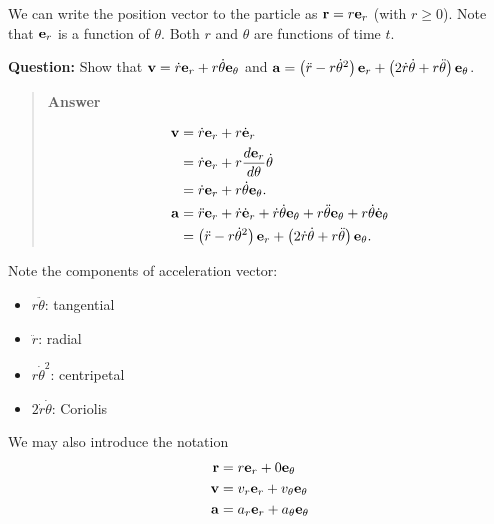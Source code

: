 \documentclass[
  letterpaper,
  DIV=11,
  numbers=noendperiod]{scrreprt}
\providecommand{\tightlist}{%
  \setlength{\itemsep}{0pt}\setlength{\parskip}{0pt}}
\newcommand{\lp}{\left(}
\newcommand{\rp}{\right)}
\begin{document}
We can write the position vector to the particle as
\({\bf r} = r{\bf e}_r\) (with \(r\geq 0\)). Note that \({\bf e}_r\) is
a function of \(\theta\). Both \(r\) and \(\theta\) are functions of
time \(t\).

\begin{tcolorbox}[enhanced jigsaw, arc=.35mm, bottomrule=.15mm, bottomtitle=1mm, breakable, colback=white, colbacktitle=quarto-callout-tip-color!10!white, colframe=quarto-callout-tip-color-frame, coltitle=black, left=2mm, leftrule=.75mm, opacityback=0, opacitybacktitle=0.6, rightrule=.15mm, title=\textcolor{quarto-callout-tip-color}{\faLightbulb}\hspace{0.5em}{Think!}, titlerule=0mm, toprule=.15mm, toptitle=1mm]

\textbf{Question:} Show that
\({\bf v} = \dot{r}{\bf e}_r+r\dot{\theta}{\bf e}_\theta\) and
\({\bf a} = \lp \ddot{r}-r\dot{\theta}^2\rp{\bf e}_r+\lp 2\dot{r}\dot{\theta}+r\ddot{\theta}\rp{\bf e}_\theta\).

\begin{quote}
\textbf{Answer}

\begin{align*}
    {\bf v} &= \dot{r}{\bf e}_r+r\dot{\bf e}_r\\
    &= \dot{r}{\bf e}_r+r\frac{d{\bf e}_r}{d\theta}\dot{\theta}\\
    &= \dot{r}{\bf e}_r+r\dot{\theta}{\bf e}_\theta.\\
    {\bf a} &= \ddot{r}{\bf e}_r+\dot{r}\dot{\bf e}_r+\dot{r}\dot{\theta}{\bf e}_\theta+r\ddot{\theta}{\bf e}_\theta+r\dot{\theta}\dot{\bf e}_\theta\\
    &= \lp \ddot{r}-r\dot{\theta}^2\rp{\bf e}_r+\lp 2\dot{r}\dot{\theta}+r\ddot{\theta}\rp{\bf e}_\theta.
\end{align*}
\end{quote}

\end{tcolorbox}

Note the components of acceleration vector:

\begin{itemize}
\tightlist
\item
  \(r\ddot{\theta}\): tangential
\item
  \(\ddot{r}\): radial
\item
  \(r\dot{\theta}^2\): centripetal
\item
  \(2\dot{r}\dot{\theta}\): Coriolis
\end{itemize}

We may also introduce the notation \begin{align*}
    {\bf r} &= r{\bf e}_r+0{\bf e}_\theta\\
    {\bf v} &= v_r{\bf e}_r+v_\theta{\bf e}_\theta\\
    {\bf a} &= a_r{\bf e}_r+a_\theta{\bf e}_\theta
\end{align*}
\end{document}
